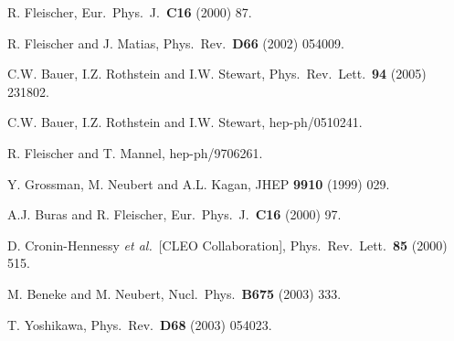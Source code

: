 \documentclass[11pt]{cernrep}
\begin{document}
\begin{thebibliography}{999}
 R. Fleischer,
 {  Eur.\ Phys.\ J.}~{\bf C16} (2000) 87.

R. Fleischer and J. Matias,
{ Phys.\ Rev.}~{\bf D66} (2002) 054009.

C.W. Bauer, I.Z. Rothstein and I.W. Stewart,
  { Phys.\ Rev.\ Lett.}~{\bf 94} (2005) 231802.
  
C.W. Bauer, I.Z. Rothstein and I.W. Stewart,
  hep-ph/0510241.
  
  R. Fleischer and T. Mannel,
  hep-ph/9706261.

Y. Grossman, M. Neubert and A.L. Kagan,
  { JHEP} {\bf 9910} (1999) 029.

A.J. Buras and R. Fleischer,
{ Eur.\ Phys.\ J.}~{\bf C16} (2000) 97.

D. Cronin-Hennessy {\it et al.}\  [CLEO Collaboration],
  { Phys.\ Rev.\ Lett.}~{\bf 85} (2000) 515.

M. Beneke and M. Neubert,
  { Nucl.\ Phys.}~{\bf B675} (2003) 333.

T. Yoshikawa,
  { Phys.\ Rev.}~{\bf D68} (2003) 054023.
 

\end{thebibliography}
\end{document}
